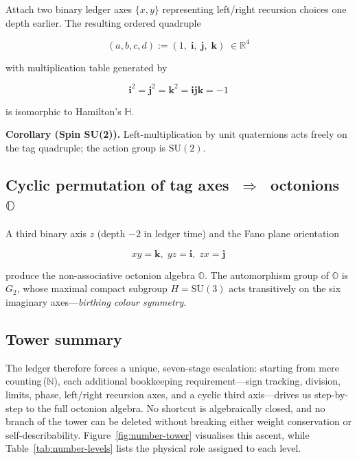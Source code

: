 Attach two binary ledger axes $\{x,y\}$ representing left/right recursion
choices one depth earlier.  The resulting ordered quadruple

\[
(a,b,c,d):=
(1,\; \mathbf i,\; \mathbf j,\; \mathbf k)\;\in\mathbb R^4
\]

with multiplication table generated by

\[
\mathbf i^2=\mathbf j^2=\mathbf k^2=\mathbf i\mathbf j\mathbf k=-1
\]

is isomorphic to Hamilton’s $\mathbb H$.

\begin{axiombox}
\textbf{Corollary (Spin SU(2)).}
Left-multiplication by unit quaternions acts freely on the tag
quadruple; the action group is $\mathrm{SU}(2)$.
\end{axiombox}

\subsection{Cyclic permutation of tag axes $\;\Rightarrow\;$ octonions $\mathbb O$}

A third binary axis $z$ (depth $-2$ in ledger time) and the Fano plane
orientation

\[
xy=\mathbf k,\; yz=\mathbf i,\; zx=\mathbf j
\]

produce the non-associative octonion algebra $\mathbb O$.
The automorphism group of $\mathbb O$ is $G_2$, whose maximal compact
subgroup $H\!=\!\mathrm{SU}(3)$ acts transitively on the six imaginary
axes—\emph{birthing colour symmetry}.

\subsection{Tower summary}

The ledger therefore forces a unique, seven-stage escalation:
starting from mere counting\,($\mathbb N$), each additional bookkeeping
requirement—sign tracking, division, limits, phase, left/right recursion
axes, and a cyclic third axis—drives us step-by-step to the full octonion
algebra.  No shortcut is algebraically closed, and no branch of the tower
can be deleted without breaking either weight conservation or
self-describability.  Figure~\ref{fig:number-tower} visualises this ascent,
while Table~\ref{tab:number-levels} lists the physical role assigned to each
level.


